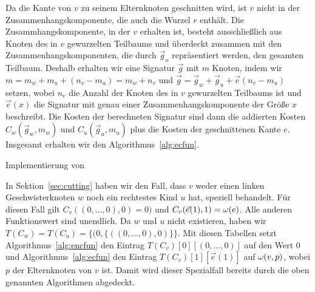 Da die Kante von $v$ zu seinem Elternknoten geschnitten wird, ist $v$ nicht in der Zusammenhangskomponente, die auch die Wurzel $r$ enthält.
Die Zusammhangskomponente, in der $v$ erhalten ist, besteht ausschließlich aus Knoten des in $v$ gewurzelten Teilbaums und überdeckt zusammen mit den Zusammenhangskomponenten, die durch $\vec{g}_u$ repräsentiert werden, den gesamten Teilbaum.
Deshalb erhalten wir eine Signatur $\vec{g}$ mit $m$ Knoten, indem wir $m = m_w + m_u + (n_v - m_u) = m_w + n_v$ und $\vec{g} = \vec{g}_w + \vec{g}_u + \vec{e}(n_v - m_u)$ setzen, wobei $n_v$ die Anzahl der Knoten des in $v$ gewurzelten Teilbaums ist und $\vec{e}(x)$ die Signatur mit genau einer Zusammenhangskomponente der Größe $x$ beschreibt.
Die Kosten der berechneten Signatur sind dann die addierten Kosten $C_w(\vec{g}_w, m_w)$ und $C_u(\vec{g}_u, m_u)$ plus die Kosten der geschnittenen Kante $e$. 
Insgesamt erhalten wir den Algorithmus~\ref{alg:ecfun}.

\begin{algorithm}
    \caption{Implementierung von }\label{alg:ecfun}
    \begin{algorithmic}[1]
             
                \Return
            \Else
                 
            \EndIf
        \EndFunction
    \end{algorithmic}
\end{algorithm}

\begin{rem}
    In Sektion~\ref{sec:cutting} haben wir den Fall, dass $v$ weder einen linken Geschwisterknoten $w$ noch ein rechtestes Kind $u$ hat, speziell behandelt.
    Für diesen Fall gilt $C_v((0,\ldots,0), 0) = 0)$ und $C_v(\vec{e}(1), 1) = \omega(e)$. 
    Alle anderen Funktionswert sind unendlich.
    Da $w$ und $u$ nicht existieren, haben wir $T(C_w) = T(C_u) = \{(0, \{((0, \ldots, 0), 0)\} \}$.
    Mit diesen Tabellen setzt Algorithmus~\ref{alg:encfun} den Eintrag $T(C_v)[0][(0,\ldots, 0)]$ auf den Wert $0$ und Algorithmus~\ref{alg:ecfun} den Eintrag $T(C_v)[1][\vec{e}(1)]$ auf $\omega(v,p)$, wobei $p$ der Elternknoten von $v$ ist.
    Damit wird dieser Spezialfall bereits durch die oben genannten Algorithmen abgedeckt.
\end{rem}

